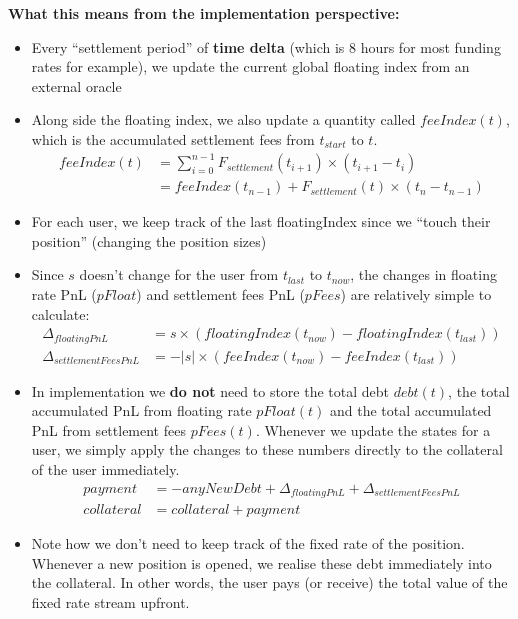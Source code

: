 \documentclass{article}%
\begin{document}
\textbf{What this means from the implementation perspective:}
\begin{itemize}
    \item Every ``settlement period'' of \textbf{time delta} (which is 8 hours for most funding rates for example), we update the current global floating index from an external oracle
    \item Along side the floating index, we also update a quantity called $feeIndex(t)$, which is the accumulated settlement fees from $t_{start}$ to $t$.
        \begin{align*}
            feeIndex(t) &= \sum_{i=0}^{n-1} F_{settlement}(t_{i+1}) \times (t_{i+1} - t_{i}) \\
                        &= feeIndex(t_{n - 1}) + F_{settlement}(t) \times (t_{n} - t_{n - 1})
        \end{align*}
    \item For each user, we keep track of the last floatingIndex since we ``touch their position'' (changing the position sizes)
    \item Since $s$ doesn't change for the user from $t_{last}$ to $t_{now}$, the changes in floating rate PnL ($pFloat$) and settlement fees PnL ($pFees$) are relatively simple to calculate:
    \begin{align}
        \Delta_{floatingPnL} &= s \times \left(floatingIndex(t_{now}) - floatingIndex(t_{last}) \right)\\
        \Delta_{settlementFeesPnL} &= - |s| \times (feeIndex(t_{now}) - feeIndex(t_{last}))
    \end{align}
    \item In implementation we \textbf{do not} need to store the total debt $debt(t)$, the total accumulated PnL from floating rate $pFloat(t)$ and the total accumulated PnL from settlement fees $pFees(t)$. Whenever we update the states for a user, we simply apply the changes to these numbers directly to the collateral of the user immediately.
    \begin{align}
        payment &= -anyNewDebt + \Delta_{floatingPnL} + \Delta_{settlementFeesPnL}\\
        collateral &= collateral + payment
    \end{align}
    \item Note how we don't need to keep track of the fixed rate of the position. Whenever a new position is opened, we realise these debt immediately into the collateral. In other words, the user pays (or receive) the total value of the fixed rate stream upfront.
\end{itemize}
\end{document}
